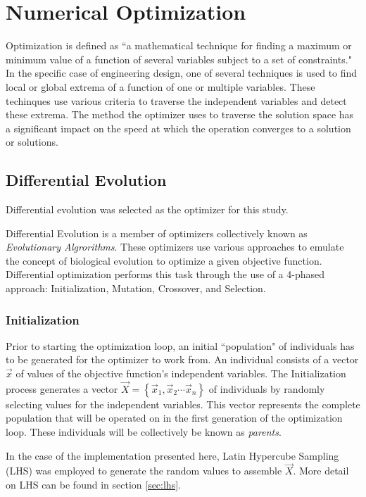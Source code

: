 \section{Numerical Optimization}
Optimization is defined as ``a mathematical technique for finding a maximum or minimum value of a function of several variables subject to a set of constraints."\cite{opt-def} In the specific case of engineering design, one of several techniques is used to find local or global extrema of a function of one or multiple variables. These techinques use various criteria to traverse the independent variables and detect these extrema. The method the optimizer uses to traverse the solution space has a significant impact on the speed at which the operation converges to a solution or solutions.\cite{basic-optim} 

\subsection{Differential Evolution}
Differential evolution was selected as the optimizer for this study. 

Differential Evolution is a member of optimizers collectively known as \emph{Evolutionary Algrorithms}. These optimizers use various approaches to emulate the concept of biological evolution to optimize a given objective function. Differential optimization performs this task through the use of a 4-phased approach: Initialization, Mutation, Crossover, and Selection. \cite{diff-evol}

\subsubsection{Initialization}
Prior to starting the optimization loop, an initial ``population" of individuals has to be generated for the optimizer to work from. An individual consists of a vector $\vec{x}$ of values of the objective function's independent variables. The Initialization process generates a vector $\vec{X} = \left\{\vec{x}_1, \vec{x}_2 \cdots \vec{x}_n\right\}$ of individuals by randomly selecting values for the independent variables. This vector represents the complete population that will be operated on in the first generation of the optimization loop. These individuals will be collectively be known as \emph{parents}.\cite{diff-evol} 

In the case of the implementation presented here, Latin Hypercube Sampling (LHS) was employed to generate the random values to assemble $\vec{X}$. More detail on LHS can be found in section \ref{sec:lhs}. 

